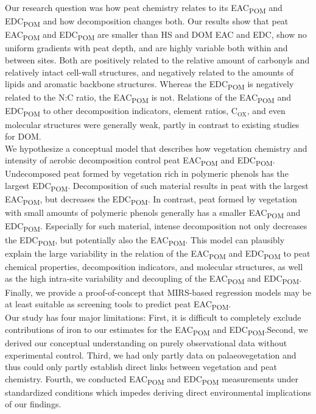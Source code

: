 \documentclass[alpha-refs, lineno]{wiley-article-rmd}
\begin{document}
Our research question was how peat chemistry relates to its EAC\textsubscript{POM} and EDC\textsubscript{POM} and how decomposition changes both. Our results show that peat EAC\textsubscript{POM} and EDC\textsubscript{POM} are smaller than HS and DOM EAC and EDC, show no uniform gradients with peat depth, and are highly variable both within and between sites. Both are positively related to the relative amount of carbonyls and relatively intact cell-wall structures, and negatively related to the amounts of lipids and aromatic backbone structures. Whereas the EDC\textsubscript{POM} is negatively related to the N:C ratio, the EAC\textsubscript{POM} is not. Relations of the EAC\textsubscript{POM} and EDC\textsubscript{POM} to other decomposition indicators, element ratios, C\(_\text{OX}\), and even molecular structures were generally weak, partly in contrast to existing studies for DOM.\\
We hypothesize a conceptual model that describes how vegetation chemistry and intensity of aerobic decomposition control peat EAC\textsubscript{POM} and EDC\textsubscript{POM}. Undecomposed peat formed by vegetation rich in polymeric phenols has the largest EDC\textsubscript{POM}. Decomposition of such material results in peat with the largest EAC\textsubscript{POM}, but decreases the EDC\textsubscript{POM}. In contrast, peat formed by vegetation with small amounts of polymeric phenols generally has a smaller EAC\textsubscript{POM} and EDC\textsubscript{POM}. Especially for such material, intense decomposition not only decreases the EDC\textsubscript{POM}, but potentially also the EAC\textsubscript{POM}. This model can plausibly explain the large variability in the relation of the EAC\textsubscript{POM} and EDC\textsubscript{POM} to peat chemical properties, decomposition indicators, and molecular structures, as well as the high intra-site variability and decoupling of the EAC\textsubscript{POM} and EDC\textsubscript{POM}.
Finally, we provide a proof-of-concept that MIRS-based regression models may be at least suitable as screening tools to predict peat EAC\textsubscript{POM}.\\
Our study has four major limitations: First, it is difficult to completely exclude contributions of iron to our estimates for the EAC\textsubscript{POM} and EDC\textsubscript{POM}.Second, we derived our conceptual understanding on purely observational data without experimental control. Third, we had only partly data on palaeovegetation and thus could only partly establish direct links between vegetation and peat chemistry. Fourth, we conducted EAC\textsubscript{POM} and EDC\textsubscript{POM} measurements under standardized conditions which impedes deriving direct environmental implications of our findings.\\
\end{document}
